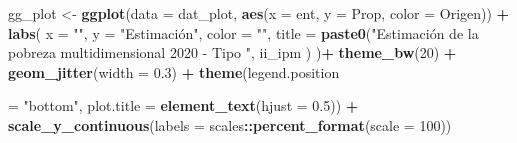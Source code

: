 \documentclass[
  12pt,
]{book}
\newenvironment{Shaded}{\begin{snugshade}}{\end{snugshade}}
\newcommand{\AttributeTok}[1]{\textcolor[rgb]{0.13,0.29,0.53}{#1}}
\newcommand{\DecValTok}[1]{\textcolor[rgb]{0.00,0.00,0.81}{#1}}
\newcommand{\FloatTok}[1]{\textcolor[rgb]{0.00,0.00,0.81}{#1}}
\newcommand{\FunctionTok}[1]{\textcolor[rgb]{0.13,0.29,0.53}{\textbf{#1}}}
\newcommand{\NormalTok}[1]{#1}
\newcommand{\OtherTok}[1]{\textcolor[rgb]{0.56,0.35,0.01}{#1}}
\newcommand{\SpecialCharTok}[1]{\textcolor[rgb]{0.81,0.36,0.00}{\textbf{#1}}}
\newcommand{\StringTok}[1]{\textcolor[rgb]{0.31,0.60,0.02}{#1}}
\begin{document}
\begin{Shaded}
\begin{Highlighting}[]
\NormalTok{    gg\_plot }\OtherTok{\textless{}{-}} \FunctionTok{ggplot}\NormalTok{(}\AttributeTok{data =}\NormalTok{ dat\_plot, }\FunctionTok{aes}\NormalTok{(}\AttributeTok{x =}\NormalTok{ ent, }\AttributeTok{y =}\NormalTok{ Prop, }\AttributeTok{color =}\NormalTok{ Origen)) }\SpecialCharTok{+}
      \FunctionTok{labs}\NormalTok{(}
        \AttributeTok{x =} \StringTok{""}\NormalTok{,}
        \AttributeTok{y =} \StringTok{"Estimación"}\NormalTok{,}
        \AttributeTok{color =} \StringTok{""}\NormalTok{,}
        \AttributeTok{title =} \FunctionTok{paste0}\NormalTok{(}\StringTok{"Estimación de la pobreza multidimensional 2020 {-} Tipo "}\NormalTok{, ii\_ipm )}
\NormalTok{      )}\SpecialCharTok{+} \FunctionTok{theme\_bw}\NormalTok{(}\DecValTok{20}\NormalTok{) }\SpecialCharTok{+}
      \FunctionTok{geom\_jitter}\NormalTok{(}\AttributeTok{width =} \FloatTok{0.3}\NormalTok{) }\SpecialCharTok{+}
      \FunctionTok{theme}\NormalTok{(legend.position}

 \OtherTok{=} \StringTok{"bottom"}\NormalTok{,}
            \AttributeTok{plot.title =} \FunctionTok{element\_text}\NormalTok{(}\AttributeTok{hjust =} \FloatTok{0.5}\NormalTok{)) }\SpecialCharTok{+}
      \FunctionTok{scale\_y\_continuous}\NormalTok{(}\AttributeTok{labels =}\NormalTok{ scales}\SpecialCharTok{::}\FunctionTok{percent\_format}\NormalTok{(}\AttributeTok{scale =} \DecValTok{100}\NormalTok{))}
   

\end{Highlighting}
\end{Shaded}
\end{document}
